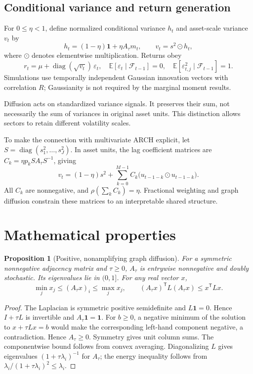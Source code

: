 \documentclass[12pt,a4paper]{article}
\newtheorem{proposition}{Proposition}
\newcommand{\E}{\mathbb E}
\newcommand{\one}{\mathbf 1}
\newcommand{\diag}{\operatorname{diag}}
\newcommand{\F}{\mathcal F}
\begin{document}
\subsection{Conditional variance and return generation}
For $0\le\eta<1$, define normalized conditional variance $h_t$ and asset-scale
variance $v_t$ by
\begin{equation}
h_t=(1-\eta)\one+\eta A_\tau m_t,\qquad
v_t=s^2\odot h_t,
\label{eq:model}
\end{equation}
where $\odot$ denotes elementwise multiplication. Returns obey
\begin{equation}
r_t=\mu+\diag(\sqrt{v_t})\,\varepsilon_t,
\quad \E[\varepsilon_t\mid\F_{t-1}]=0,\quad
\E[\varepsilon_{t,j}^2\mid\F_{t-1}]=1.
\label{eq:returnmodel}
\end{equation}
Simulations use temporally independent Gaussian innovation vectors with
correlation $R$; Gaussianity is not required by the marginal moment results.

Diffusion acts on standardized variance signals. It preserves their sum, not
necessarily the sum of variances in original asset units. This distinction
allows sectors to retain different volatility scales.

To make the connection with multivariate ARCH explicit, let
$S=\diag(s_1^2,\ldots,s_J^2)$. In asset units, the lag coefficient matrices are
$C_k=\eta p_k S A_\tau S^{-1}$, giving
\[
v_t=(1-\eta)s^2+
\sum_{k=0}^{M-1}C_k\bigl(u_{t-1-k}\odot u_{t-1-k}\bigr).
\]
All $C_k$ are nonnegative, and
$\rho(\sum_k C_k)=\eta$. Fractional weighting and graph diffusion constrain
these matrices to an interpretable shared structure.

\section{Mathematical properties}
\begin{proposition}[Positive, nonamplifying graph diffusion]
For a symmetric nonnegative adjacency matrix and $\tau\ge0$, $A_\tau$ is
entrywise nonnegative and doubly stochastic. Its eigenvalues lie in $(0,1]$.
For any real vector $x$,
\begin{equation}
\min_jx_j\le(A_\tau x)_i\le\max_jx_j,\qquad
(A_\tau x)^{\mathsf T}L(A_\tau x)\le x^{\mathsf T}Lx.
\end{equation}
\end{proposition}
\begin{proof}
The Laplacian is symmetric positive semidefinite and $L\one=0$. Hence
$I+\tau L$ is invertible and $A_\tau\one=\one$. For $b\ge0$, a negative minimum
of the solution to $x+\tau Lx=b$ would make the corresponding left-hand component
negative, a contradiction. Hence $A_\tau\ge0$. Symmetry gives unit column sums.
The componentwise bound follows from convex averaging. Diagonalizing $L$ gives
eigenvalues $(1+\tau\lambda_i)^{-1}$ for $A_\tau$; the energy inequality follows
from $\lambda_i/(1+\tau\lambda_i)^2\le\lambda_i$.
\end{proof}
\end{document}
